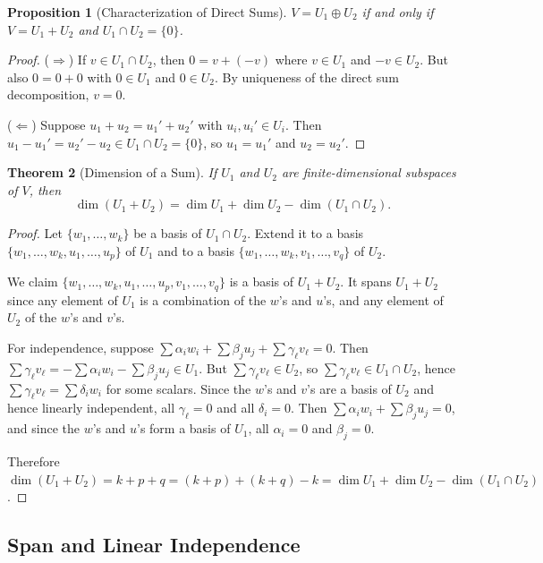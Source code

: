 \documentclass[11pt,a4paper]{article}
\theoremstyle{definition}
\theoremstyle{plain}
\newtheorem{theorem}{Theorem}[section]
\newtheorem{proposition}[theorem]{Proposition}
\theoremstyle{remark}
\begin{document}
\begin{proposition}[Characterization of Direct Sums]
\label{prop:direct_sum_char}
$V = U_1 \oplus U_2$ if and only if $V = U_1 + U_2$ and $U_1 \cap U_2 = \{0\}$.
\end{proposition}

\begin{proof}
($\Rightarrow$) If $v \in U_1 \cap U_2$, then $0 = v + (-v)$ where $v \in U_1$ and
$-v \in U_2$. But also $0 = 0 + 0$ with $0 \in U_1$ and $0 \in U_2$. By uniqueness
of the direct sum decomposition, $v = 0$.

($\Leftarrow$) Suppose $u_1 + u_2 = u_1' + u_2'$ with $u_i, u_i' \in U_i$. Then
$u_1 - u_1' = u_2' - u_2 \in U_1 \cap U_2 = \{0\}$, so $u_1 = u_1'$ and $u_2 = u_2'$.
\end{proof}

\begin{theorem}[Dimension of a Sum]
\label{thm:dim_sum}
If $U_1$ and $U_2$ are finite-dimensional subspaces of $V$, then
\[
    \dim(U_1 + U_2) = \dim U_1 + \dim U_2 - \dim(U_1 \cap U_2).
\]
\end{theorem}

\begin{proof}
Let $\{w_1, \ldots, w_k\}$ be a basis of $U_1 \cap U_2$. Extend it to a basis
$\{w_1, \ldots, w_k, u_1, \ldots, u_p\}$ of $U_1$ and to a basis
$\{w_1, \ldots, w_k, v_1, \ldots, v_q\}$ of $U_2$.

We claim $\{w_1, \ldots, w_k, u_1, \ldots, u_p, v_1, \ldots, v_q\}$ is a basis
of $U_1 + U_2$. It spans $U_1 + U_2$ since any element of $U_1$ is a combination
of the $w$'s and $u$'s, and any element of $U_2$ of the $w$'s and $v$'s.

For independence, suppose $\sum \alpha_i w_i + \sum \beta_j u_j + \sum \gamma_\ell v_\ell = 0$.
Then $\sum \gamma_\ell v_\ell = -\sum \alpha_i w_i - \sum \beta_j u_j \in U_1$. But
$\sum \gamma_\ell v_\ell \in U_2$, so $\sum \gamma_\ell v_\ell \in U_1 \cap U_2$,
hence $\sum \gamma_\ell v_\ell = \sum \delta_i w_i$ for some scalars. Since the
$w$'s and $v$'s are a basis of $U_2$ and hence linearly independent, all $\gamma_\ell = 0$
and all $\delta_i = 0$. Then $\sum \alpha_i w_i + \sum \beta_j u_j = 0$, and since
the $w$'s and $u$'s form a basis of $U_1$, all $\alpha_i = 0$ and $\beta_j = 0$.

Therefore $\dim(U_1 + U_2) = k + p + q = (k + p) + (k + q) - k = \dim U_1 + \dim U_2
- \dim(U_1 \cap U_2)$.
\end{proof}

\subsection{Span and Linear Independence}
\label{subsec:span_independence}
\end{document}
